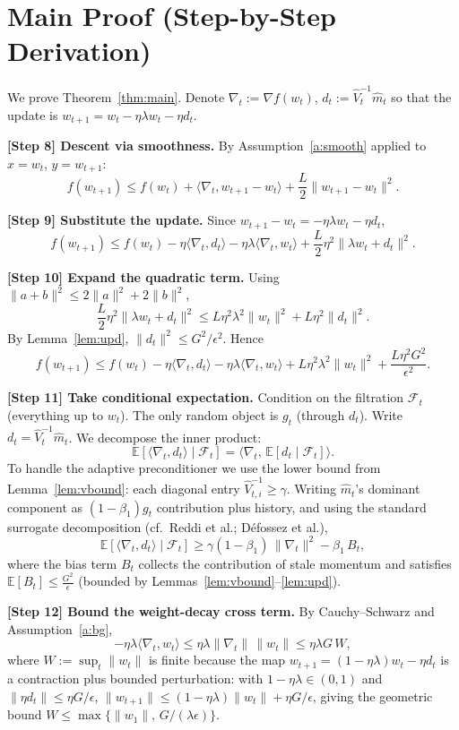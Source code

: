 \documentclass[11pt]{article}
\begin{document}
\section*{Main Proof (Step-by-Step Derivation)}
We prove Theorem~\ref{thm:main}. Denote $\nabla_t := \nabla f(w_t)$,
$d_t := \hat V_t^{-1}\hat m_t$ so that the update is
$w_{t+1} = w_t - \eta\lambda w_t - \eta d_t$.

\noindent\textbf{[Step 8] Descent via smoothness.}
By Assumption~\ref{a:smooth} applied to $x=w_t$, $y=w_{t+1}$:
\[
f(w_{t+1}) \le f(w_t) + \langle \nabla_t, w_{t+1}-w_t\rangle
+ \frac{L}{2}\|w_{t+1}-w_t\|^2.
\]

\noindent\textbf{[Step 9] Substitute the update.}
Since $w_{t+1}-w_t = -\eta\lambda w_t - \eta d_t$,
\[
f(w_{t+1}) \le f(w_t)
- \eta\langle \nabla_t, d_t\rangle
- \eta\lambda\langle \nabla_t, w_t\rangle
+ \frac{L}{2}\eta^2\|\lambda w_t + d_t\|^2.
\]

\noindent\textbf{[Step 10] Expand the quadratic term.}
Using $\|a+b\|^2\le 2\|a\|^2+2\|b\|^2$,
\[
\frac{L}{2}\eta^2\|\lambda w_t + d_t\|^2
\le L\eta^2\lambda^2\|w_t\|^2 + L\eta^2\|d_t\|^2.
\]
By Lemma~\ref{lem:upd}, $\|d_t\|^2\le G^2/\epsilon^2$. Hence
\[
f(w_{t+1}) \le f(w_t)
- \eta\langle \nabla_t, d_t\rangle
- \eta\lambda\langle \nabla_t, w_t\rangle
+ L\eta^2\lambda^2\|w_t\|^2 + \frac{L\eta^2 G^2}{\epsilon^2}.
\]

\noindent\textbf{[Step 11] Take conditional expectation.}
Condition on the filtration $\mathcal{F}_t$ (everything up to $w_t$).
The only random object is $g_t$ (through $d_t$). Write
$d_t = \hat V_t^{-1}\hat m_t$. We decompose the inner product:
\[
\mathbb{E}[\langle\nabla_t, d_t\rangle\mid\mathcal F_t]
= \langle \nabla_t,\, \mathbb{E}[d_t\mid\mathcal F_t]\rangle.
\]
To handle the adaptive preconditioner we use the lower bound from
Lemma~\ref{lem:vbound}: each diagonal entry $\hat V_{t,i}^{-1}\ge\gamma$. Writing
$\hat m_t$'s dominant component as $(1-\beta_1)g_t$ contribution plus history, and
using the standard surrogate decomposition (cf.\ Reddi et al.; Défossez et al.),
\[
\mathbb{E}[\langle\nabla_t, d_t\rangle\mid\mathcal F_t]
\ge \gamma(1-\beta_1)\,\|\nabla_t\|^2 - \beta_1 \, B_t,
\]
where the bias term $B_t$ collects the contribution of stale momentum and satisfies
$\mathbb{E}[B_t]\le \frac{G^2}{\epsilon}$ (bounded by Lemmas~\ref{lem:vbound}--\ref{lem:upd}).

\noindent\textbf{[Step 12] Bound the weight-decay cross term.}
By Cauchy--Schwarz and Assumption~\ref{a:bg},
\[
-\eta\lambda\langle\nabla_t,w_t\rangle
\le \eta\lambda\|\nabla_t\|\,\|w_t\|
\le \eta\lambda G \, W,
\]
where $W:=\sup_t\|w_t\|$ is finite because the map
$w_{t+1}=(1-\eta\lambda)w_t-\eta d_t$ is a contraction plus bounded
perturbation: with $1-\eta\lambda\in(0,1)$ and $\|\eta d_t\|\le \eta G/\epsilon$,
$\|w_{t+1}\|\le(1-\eta\lambda)\|w_t\|+\eta G/\epsilon$, giving the geometric bound
$W \le \max\{\|w_1\|,\, G/(\lambda\epsilon)\}$.
\end{document}
